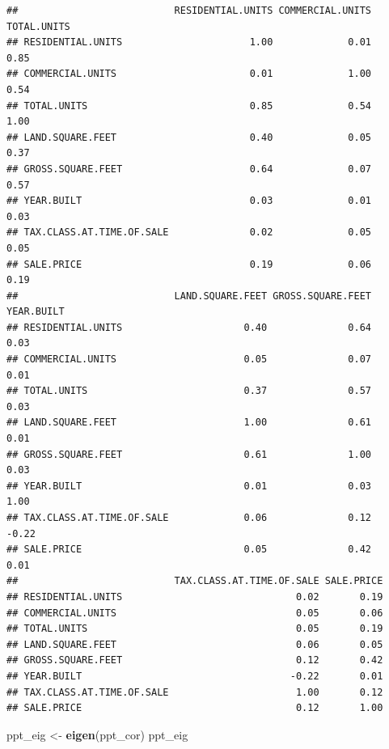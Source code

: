 \documentclass[]{article}
\newenvironment{Shaded}{\begin{snugshade}}{\end{snugshade}}
\newcommand{\KeywordTok}[1]{\textcolor[rgb]{0.13,0.29,0.53}{\textbf{#1}}}
\newcommand{\NormalTok}[1]{#1}
\newcommand{\StringTok}[1]{\textcolor[rgb]{0.31,0.60,0.02}{#1}}
\begin{document}
\begin{verbatim}
##                           RESIDENTIAL.UNITS COMMERCIAL.UNITS TOTAL.UNITS
## RESIDENTIAL.UNITS                      1.00             0.01        0.85
## COMMERCIAL.UNITS                       0.01             1.00        0.54
## TOTAL.UNITS                            0.85             0.54        1.00
## LAND.SQUARE.FEET                       0.40             0.05        0.37
## GROSS.SQUARE.FEET                      0.64             0.07        0.57
## YEAR.BUILT                             0.03             0.01        0.03
## TAX.CLASS.AT.TIME.OF.SALE              0.02             0.05        0.05
## SALE.PRICE                             0.19             0.06        0.19
##                           LAND.SQUARE.FEET GROSS.SQUARE.FEET YEAR.BUILT
## RESIDENTIAL.UNITS                     0.40              0.64       0.03
## COMMERCIAL.UNITS                      0.05              0.07       0.01
## TOTAL.UNITS                           0.37              0.57       0.03
## LAND.SQUARE.FEET                      1.00              0.61       0.01
## GROSS.SQUARE.FEET                     0.61              1.00       0.03
## YEAR.BUILT                            0.01              0.03       1.00
## TAX.CLASS.AT.TIME.OF.SALE             0.06              0.12      -0.22
## SALE.PRICE                            0.05              0.42       0.01
##                           TAX.CLASS.AT.TIME.OF.SALE SALE.PRICE
## RESIDENTIAL.UNITS                              0.02       0.19
## COMMERCIAL.UNITS                               0.05       0.06
## TOTAL.UNITS                                    0.05       0.19
## LAND.SQUARE.FEET                               0.06       0.05
## GROSS.SQUARE.FEET                              0.12       0.42
## YEAR.BUILT                                    -0.22       0.01
## TAX.CLASS.AT.TIME.OF.SALE                      1.00       0.12
## SALE.PRICE                                     0.12       1.00
\end{verbatim}

\begin{Shaded}
\begin{Highlighting}[]
\NormalTok{ppt_eig <-}\StringTok{ }\KeywordTok{eigen}\NormalTok{(ppt_cor)}
\NormalTok{ppt_eig}
\end{Highlighting}
\end{Shaded}
\end{document}
